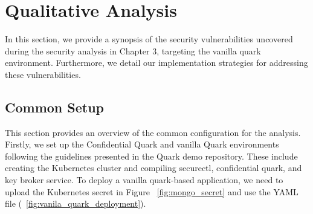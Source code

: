 \section{Qualitative Analysis}
In this section, we provide a synopsis of the security vulnerabilities uncovered during the security analysis in Chapter 3, targeting the vanilla quark environment. Furthermore, we detail our implementation strategies for addressing these vulnerabilities.

\subsection{Common Setup}

This section provides an overview of the common configuration for the analysis. Firstly, we set up the Confidential Quark and vanilla Quark environments following the guidelines presented in the Quark demo repository\cite*{Qaurk_Demo_for_qualitativ}.
These include creating the Kubernetes cluster and compiling securectl, confidential quark, and key broker service. To deploy a vanilla quark-based application, we need to upload the Kubernetes secret\cite*{k8s_secret_yaml} in Figure ~\ref{fig:mongo_secret} and use 
the YAML file\cite*{vanilla_quark_deploy_for_qualitativ_yaml} (~\ref{fig:vanila_quark_deployment}). 


